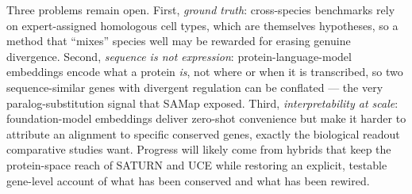 \documentclass[10pt,twocolumn]{article}
\begin{document}
Three problems remain open. First, \emph{ground truth}: cross-species benchmarks rely
on expert-assigned homologous cell types, which are themselves hypotheses, so a method
that ``mixes'' species well may be rewarded for erasing genuine divergence. Second,
\emph{sequence is not expression}: protein-language-model embeddings encode what a
protein \emph{is}, not where or when it is transcribed, so two sequence-similar genes
with divergent regulation can be conflated --- the very paralog-substitution signal
that SAMap exposed. Third, \emph{interpretability at scale}: foundation-model
embeddings deliver zero-shot convenience but make it harder to attribute an alignment
to specific conserved genes, exactly the biological readout comparative studies want.
Progress will likely come from hybrids that keep the protein-space reach of SATURN and
UCE while restoring an explicit, testable gene-level account of what has been
conserved and what has been rewired.
\end{document}
